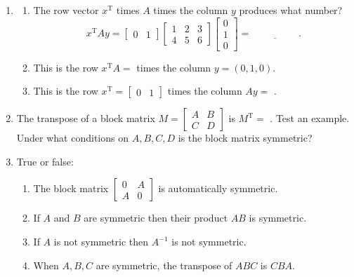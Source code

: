 \documentclass[14pt, a4paper]{article}
\begin{document}
\begin{enumerate}
    \item
          \begin{enumerate}
              \item The row vector $x^{\mathrm{T}}$ times $A$ times the column $y$ produces what number?
                    \[
                        x^{\mathrm{T}}Ay = \begin{bmatrix}0 & 1\end{bmatrix}
                        \begin{bmatrix}1 & 2 & 3 \\ 4 & 5 & 6\end{bmatrix}
                        \begin{bmatrix}0 \\ 1 \\ 0\end{bmatrix} = \underline{\hspace{2cm}}.
                    \]
              \item This is the row $x^{\mathrm{T}}A =$ \underline{\hspace{2cm}} times the column $y = (0,1,0)$.
              \item This is the row $x^{\mathrm{T}} = \begin{bmatrix}0 & 1\end{bmatrix}$ times the column $Ay =$ \underline{\hspace{2cm}}.
          \end{enumerate}

    \item The transpose of a block matrix $M = \begin{bmatrix}A & B \\ C & D\end{bmatrix}$ is $M^{\mathrm{T}} =$ \underline{\hspace{2cm}}. Test an example. Under what conditions on $A,B,C,D$ is the block matrix symmetric?

    \item True or false:
          \begin{enumerate}
              \item The block matrix $\begin{bmatrix}0 & A \\ A & 0\end{bmatrix}$ is automatically symmetric.
              \item If $A$ and $B$ are symmetric then their product $AB$ is symmetric.
              \item If $A$ is not symmetric then $A^{-1}$ is not symmetric.
              \item When $A,B,C$ are symmetric, the transpose of $ABC$ is $CBA$.
          \end{enumerate}

\end{enumerate}
\end{document}
